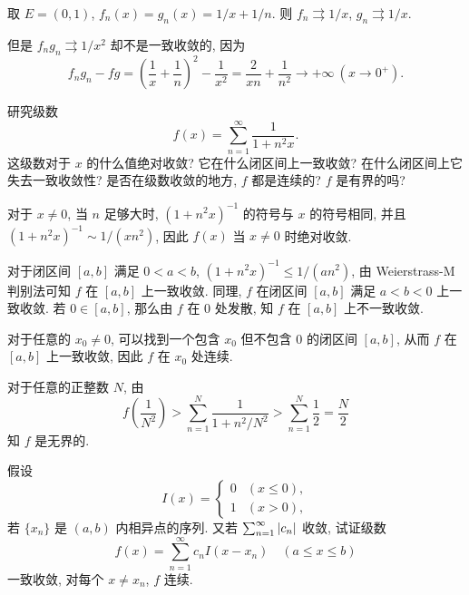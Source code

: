 \documentclass{article}
\begin{document}
\begin{solution}
  取 \( E=(0,1) \), \( f_n(x)=g_n(x)=1/x+1/n \). 则 \( f_n \rightrightarrows 1/x \), \( g_n \rightrightarrows 1/x \).
  
  但是 \( f_n g_n \rightrightarrows 1/x^2 \) 却不是一致收敛的, 因为
  \[ f_ng_n-fg = \left( \frac{1}{x}+\frac{1}{n} \right)^2 - \frac{1}{x^2} = \frac{2}{xn} + \frac{1}{n^2} \to+\infty\ (x\to 0^+). \]
\end{solution}



\begin{problem}[7-4]
研究级数
\[
f(x) = \sum_{n=1}^\infty \frac{1}{1 + n^2 x}.
\]
这级数对于 $x$ 的什么值绝对收敛? 它在什么闭区间上一致收敛? 在什么闭区间上它失去一致收敛性? 是否在级数收敛的地方, $f$ 都是连续的? $f$ 是有界的吗?
\end{problem}

\begin{solution}
  对于 \( x\neq 0 \), 当 \( n \) 足够大时, \( (1+n^2x)^{-1} \) 的符号与 \( x \) 的符号相同, 并且 \( (1+n^2x)^{-1} \sim 1/(xn^2) \), 因此 \( f(x) \) 当 \( x\neq 0 \) 时绝对收敛.

  对于闭区间 \( [a,b] \) 满足 \( 0<a<b \), \( (1+n^2x)^{-1} \le 1/(an^2) \), 由 Weierstrass-M 判别法可知 \( f \) 在 \( [a,b] \) 上一致收敛. 同理, \( f \) 在闭区间 \( [a,b] \) 满足 \( a<b<0 \) 上一致收敛. 若 \( 0\in [a,b] \), 那么由 \( f \) 在 \( 0 \) 处发散, 知 \( f \) 在 \( [a,b] \) 上不一致收敛.

  对于任意的 \( x_0 \neq 0 \), 可以找到一个包含 \( x_0 \) 但不包含 \( 0 \) 的闭区间 \( [a,b] \), 从而 \( f \) 在 \( [a,b] \) 上一致收敛, 因此 \( f \) 在 \( x_0 \) 处连续. 

  对于任意的正整数 \( N \), 由
  \[ f\left( \frac{1}{N^2} \right) > \sum_{n=1}^{N} \frac{1}{1+n^2/N^2} > \sum_{n=1}^{N} \frac{1}{2} = \frac{N}{2} \]
  知 \( f \) 是无界的.
\end{solution}



\begin{problem}[7-8]
假设
\[
I(x) =
\begin{cases}
0 & (x \le 0),\\
1 & (x > 0),
\end{cases}
\]
若 $\{x_n\}$ 是 $(a, b)$ 内相异点的序列. 又若 $\sum_{n=1}^\infty \left|c_n\right|$ 收敛, 试证级数
\[
f(x) = \sum_{n=1}^\infty c_n I(x - x_n) \quad (a \le x \le b)
\]
一致收敛, 对每个 $x \ne x_n$, $f$ 连续.
\end{problem}
\end{document}
